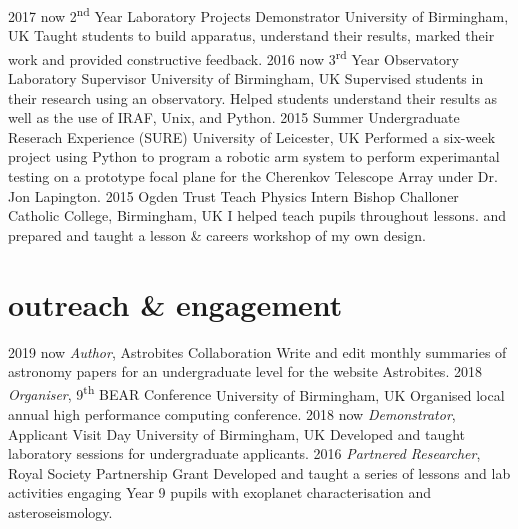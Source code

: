 \documentclass[]{k-cv} %
\begin{document}
\begin{entrylist}
\entry
{2017 \to now}
{2\textsuperscript{nd} Year Laboratory Projects Demonstrator}
{University of Birmingham, UK}
{Taught students to build apparatus, understand their results, marked their work and provided constructive feedback.}
\entry
{2016 \to now}
{3\textsuperscript{rd} Year Observatory Laboratory Supervisor}
{University of Birmingham, UK}
{Supervised students in their research using an observatory. Helped students understand their results as well as the use of IRAF, Unix, and Python.}
\entry
{2015}
{Summer Undergraduate Reserach Experience (SURE)}
{University of Leicester, UK}
{Performed a six-week project using Python to program a robotic arm system to perform experimantal testing
on a prototype focal plane for the Cherenkov Telescope Array under Dr. Jon
Lapington.}
\entry
{2015}
{Ogden Trust Teach Physics Intern}
{Bishop Challoner Catholic College, Birmingham, UK}
{I helped teach pupils throughout lessons. and prepared and taught a lesson \& careers workshop of my own
design.}
\end{entrylist}




\section{outreach \& engagement}

\begin{entrylist}
\entry
{2019 \to now}
{\emph{Author}, Astrobites Collaboration}
{}
{Write and edit monthly summaries of astronomy papers for an undergraduate level for the website Astrobites.}
\entry
{2018 }
{\emph{Organiser}, 9\textsuperscript{th} BEAR Conference}
{University of Birmingham, UK}
{Organised local annual high performance computing conference.}
\entry
{2018 \to now}
{\emph{Demonstrator}, Applicant Visit Day}
{University of Birmingham, UK}
{Developed and taught laboratory sessions for undergraduate applicants.}
\entry
{2016 }
{\emph{Partnered Researcher}, Royal Society Partnership Grant}
{}
{Developed and taught a series of lessons and lab activities engaging Year 9 pupils with exoplanet characterisation and asteroseismology.}
\end{entrylist}
\end{document}
